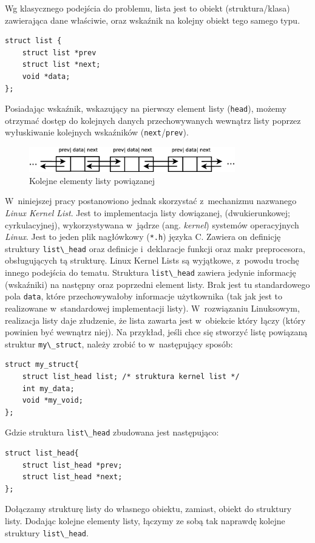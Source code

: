 \documentclass[a4paper,12pt,polish,oneside,openright]{thesis}
\newcommand\code[1]{\lstinline[style=line]{#1}}
\begin{document}
Wg klasycznego podejścia do problemu, lista jest to obiekt (struktura/klasa) zawierająca dane właściwie, oraz wskaźnik na kolejny obiekt tego samego typu.\cite{algo}
\begin{lstlisting}[style=code,caption=Idea listy powiązanej w~C]
struct list {
	struct list *prev
	struct list *next;
	void *data;
};
\end{lstlisting}
Posiadając wskaźnik, wskazujący na pierwszy element listy (\code{head}), możemy otrzymać dostęp do kolejnych danych przechowywanych wewnątrz listy poprzez wyłuskiwanie kolejnych wskaźników (\code{next}/\code{prev}).

\begin{figure}[htb]
	\begin{center}
		\includegraphics[width=0.80\textwidth]{linkedlist.eps}
		\caption{Kolejne elementy listy powiązanej}
	\end{center}
\end{figure}

W~niniejszej pracy postanowiono jednak skorzystać z~mechanizmu nazwanego \emph{Linux Kernel List}.
Jest to implementacja listy dowiązanej, (dwukierunkowej; cyrkulacyjnej), wykorzystywana w~jądrze (ang. \emph{kernel}) systemów operacyjnych \emph{Linux}\cite{lkl}.
Jest to jeden plik nagłówkowy (\code{*.h}) języka C.
Zawiera on definicję struktury \code{list\_head} oraz definicje i~deklaracje funkcji oraz makr preprocesora, obsługujących tą strukturę.
Linux Kernel Lists są wyjątkowe, z~powodu trochę innego podejścia do tematu.
Struktura \code{list\_head} zawiera jedynie informację (wskaźniki) na następny oraz poprzedni element listy.
Brak jest tu standardowego pola \code{data}, które przechowywałoby informacje użytkownika (tak jak jest to realizowane w~standardowej implementacji listy).
W~rozwiązaniu Linuksowym, realizacja listy daje złudzenie, że lista zawarta jest w~obiekcie który łączy (który powinien być wewnątrz niej).
Na przykład, jeśli chce się stworzyć listę powiązaną struktur \code{my\_struct}, należy zrobić to w~następujący sposób:
\begin{lstlisting}[style=code,caption=Przykład tworzenia listy powiązanej za pomocą Kernel Lined List]
struct my_struct{
	struct list_head list; /* struktura kernel list */
	int my_data;
	void *my_void;
};
\end{lstlisting}
Gdzie struktura \code{list\_head} zbudowana jest następująco:
\begin{lstlisting}[style=code]
struct list_head{
	struct list_head *prev;
	struct list_head *next;
};
\end{lstlisting}
Dołączamy strukturę listy do własnego obiektu, zamiast, obiekt do struktury listy.
Dodając kolejne elementy listy, łączymy ze sobą tak naprawdę kolejne struktury \code{list\_head}.
\end{document}
